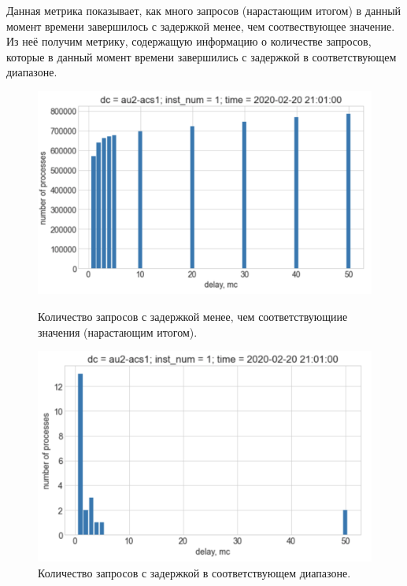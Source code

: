 \documentclass[14pt, a4paper]{extarticle}
\begin{document}
	Данная метрика показывает, как много запросов (нарастающим итогом) в данный момент времени завершилось с задержкой менее, чем соотвествующее значение. Из неё получим метрику, содержащую информацию о количестве запросов, которые в данный момент времени завершились с задержкой в соответствующем диапазоне.
	\begin{figure}[!htb]
		\includegraphics[width=\linewidth]{figures/delays_under_time.png}
		\caption{Количество запросов с задержкой менее, чем соответствующиие значения (нарастающим итогом).}
		\endminipage\hfill
		\includegraphics[width=\linewidth]{figures/delays_with_time.png}
		\caption{Количество запросов с задержкой в соответствующем диапазоне.}
		\endminipage
	\end{figure}
	
\end{document}
